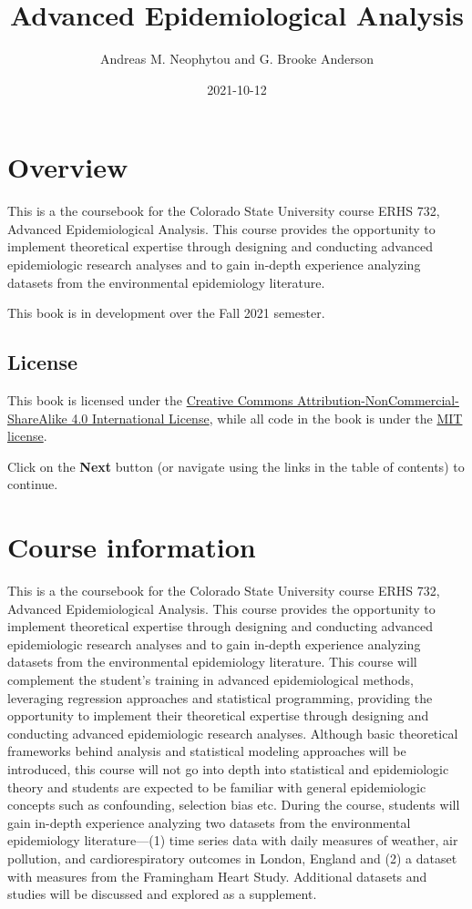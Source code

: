 \documentclass[
]{book}
\title{Advanced Epidemiological Analysis}
\author{Andreas M. Neophytou and G. Brooke Anderson}
\date{2021-10-12}
\begin{document}
\maketitle

{
\setcounter{tocdepth}{1}
\tableofcontents
}
\hypertarget{overview}{%
\chapter{Overview}\label{overview}}

This is a the coursebook for the Colorado State University course ERHS 732,
Advanced Epidemiological Analysis. This course provides the opportunity to
implement theoretical expertise through designing and conducting advanced
epidemiologic research analyses and to gain in-depth experience analyzing
datasets from the environmental epidemiology literature.

This book is in development over the Fall 2021 semester.

\hypertarget{license}{%
\section{License}\label{license}}

This book is licensed under the \href{https://creativecommons.org/licenses/by-nc-sa/4.0/}{Creative Commons
Attribution-NonCommercial-ShareAlike 4.0 International
License}, while all code in
the book is under the \href{https://opensource.org/licenses/MIT}{MIT license}.

Click on the \textbf{Next} button (or navigate using the links in the table of
contents) to continue.

\hypertarget{courseinfo}{%
\chapter{Course information}\label{courseinfo}}

This is a the coursebook for the Colorado State University course ERHS 732,
Advanced Epidemiological Analysis. This course provides the opportunity to
implement theoretical expertise through designing and conducting advanced
epidemiologic research analyses and to gain in-depth experience analyzing
datasets from the environmental epidemiology literature. This course will
complement the student's training in advanced epidemiological methods,
leveraging regression approaches and statistical programming, providing the
opportunity to implement their theoretical expertise through designing and
conducting advanced epidemiologic research analyses. Although basic theoretical frameworks behind analysis and statistical modeling approaches will be introduced, this course will not go into depth into statistical and epidemiologic theory and students are expected to be familiar with general epidemiologic concepts such as confounding, selection bias etc. During the course,
students will gain in-depth experience analyzing two datasets from the
environmental epidemiology literature---(1) time series data with daily measures
of weather, air pollution, and cardiorespiratory outcomes in London, England and
(2) a dataset with measures from the Framingham Heart Study. Additional datasets
and studies will be discussed and explored as a supplement.
\end{document}

